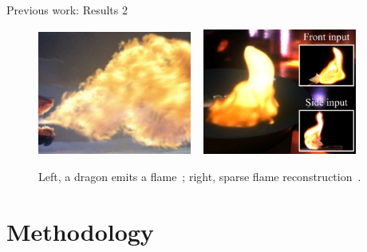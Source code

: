 \documentclass{beamer}
\begin{document}
\begin{frame}{Previous work: Results 2}

\begin{figure}[t!]
\begin{center}
\includegraphics[width=0.45\textwidth]{img/jamriska_2015} 
~
\includegraphics[width=0.45\textwidth]{img/okabe_2015}
\caption*{\tiny{Left, a dragon emits a flame~\cite{Jamriska:2015}; right, sparse flame reconstruction~\cite{Okabe:2015}.}}
\end{center}
\end{figure}

\end{frame}

\section{Methodology}
\subsection{ }
\end{document}
